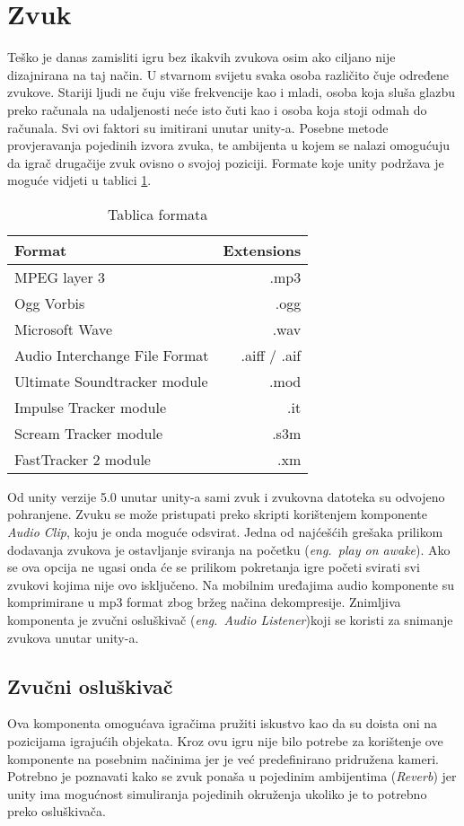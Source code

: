 \section{Zvuk}
Teško je danas zamisliti igru bez ikakvih zvukova osim ako ciljano nije dizajnirana na taj način. U stvarnom svijetu svaka osoba različito čuje određene zvukove. Stariji ljudi ne čuju više frekvencije kao i mladi, osoba koja sluša glazbu preko računala na udaljenosti neće isto čuti kao i osoba koja stoji odmah do računala. Svi ovi faktori su imitirani unutar unity-a. Posebne metode provjeravanja pojedinih izvora zvuka, te ambijenta u kojem se nalazi omogućuju da igrač drugačije zvuk ovisno o svojoj poziciji. Formate koje unity podržava je moguće vidjeti u tablici \ref{table:tablicaFormata}.

\begin{table}[h]
\large
\begin{tabular}{ l | r } \hline	
	Format & Extensions \\
	\hline MPEG layer 3 & .mp3 \\
	\hline Ogg Vorbis  & .ogg \\
	\hline Microsoft Wave  & .wav \\
	\hline Audio Interchange File Format & .aiff / .aif \\
	\hline Ultimate Soundtracker module  & .mod \\
	\hline Impulse Tracker module  & .it \\
	\hline Scream Tracker module & .s3m \\
	\hline FastTracker 2 module  & .xm \\
\end{tabular}
	\label{table:tablicaFormata}
	\caption{Tablica formata}
\end{table}

Od unity verzije 5.0 unutar unity-a sami zvuk i zvukovna datoteka su odvojeno pohranjene. Zvuku se može pristupati preko skripti korištenjem komponente \emph{Audio Clip}, koju je onda moguće odsvirat. Jedna od najćešćih grešaka prilikom dodavanja zvukova je ostavljanje sviranja na početku (\emph{eng.~play on awake}). Ako se ova opcija ne ugasi onda će se prilikom pokretanja igre početi svirati svi zvukovi kojima nije ovo isključeno. Na mobilnim uređajima audio komponente su komprimirane u mp3 format zbog bržeg načina dekompresije. Znimljiva komponenta je zvučni osluškivač (\emph{eng.~Audio Listener})koji se koristi za snimanje zvukova unutar unity-a.
\newpage
\subsection{Zvučni osluškivač}
Ova komponenta omogućava igračima pružiti iskustvo kao da su doista oni na pozicijama igrajućih objekata. Kroz ovu igru nije bilo potrebe za korištenje ove komponente na posebnim načinima jer je već predefinirano pridružena kameri. Potrebno je poznavati kako se zvuk ponaša u pojedinim ambijentima (\emph{Reverb}) jer unity ima mogućnost simuliranja pojedinih okruženja ukoliko je to potrebno preko osluškivača. \par

